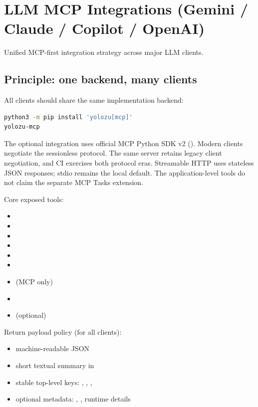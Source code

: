 \chapter{LLM MCP Integrations (Gemini / Claude / Copilot / OpenAI)}
{Unified MCP-first integration strategy across major LLM clients.}


\section{Principle: one backend, many clients}

All clients should share the same implementation backend:

\begin{lstlisting}[language=bash]
python3 -m pip install 'yolozu[mcp]'
yolozu-mcp
\end{lstlisting}

The optional integration uses official MCP Python SDK v2
(). Modern clients negotiate the sessionless
 protocol. The same server retains legacy client negotiation,
and CI exercises both protocol eras. Streamable HTTP uses stateless JSON
responses; stdio remains the local default. The application-level
 tools do not claim the separate MCP Tasks extension.

Core exposed tools:
\begin{itemize}
  \item {}
  \item {}
  \item {}
  \item {}
  \item {}
  \item {}
  \item {} (MCP only)
  \item {}
  \item {} (optional)
\end{itemize}

Return payload policy (for all clients):
\begin{itemize}
  \item machine-readable JSON
  \item short textual summary in 
  \item stable top-level keys: , , , 
  \item optional metadata: , , runtime details
\end{itemize}

